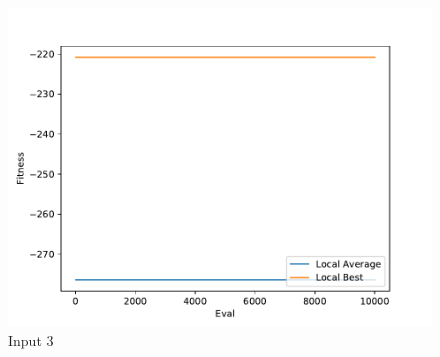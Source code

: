 \documentclass{standalone}
\begin{document}
\begin{figure}[!htb]
	\caption{Input 3}
	\label{fig:graph_3006}
	\includegraphics[width=\textwidth]{../graphs/graphs/3006.pdf}
\end{figure}
\end{document}
